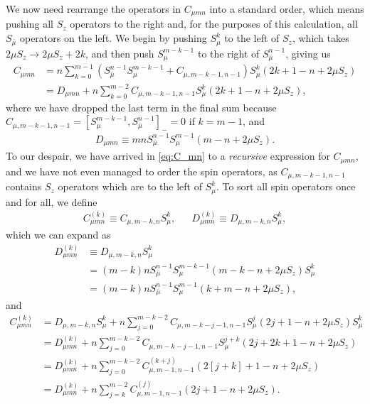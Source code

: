 \documentclass[aps,notitlepage,nofootinbib,11pt]{revtex4-1}
\newcommand{\p}[1]{\left(#1\right)} %
\renewcommand{\sp}[1]{\left[#1\right]} %
\newcommand{\bmu}{{\bar\mu}}
\newcommand{\1}{\mathds{1}}
\begin{document}
We now need rearrange the operators in $C_{\mu mn}$ into a standard
order, which means pushing all $S_z$ operators to the right and, for
the purposes of this calculation, all $S_\bmu$ operators on the left.
We begin by pushing $S_\mu^k$ to the left of $S_z$, which takes
$2\mu S_z\to 2\mu S_z+2k$, and then push $S_\mu^{m-k-1}$ to the right
of $S_\bmu^{n-1}$, giving us
\begin{align}
  C_{\mu mn}
  &= n \sum_{k=0}^{m-1}
  \p{S_\bmu^{n-1} S_\mu^{m-k-1} + C_{\mu,m-k-1,n-1}} S_\mu^k
  \p{2k + 1 - n + 2\mu S_z} \\
  &= D_{\mu mn}
  + n \sum_{k=0}^{m-2} C_{\mu,m-k-1,n-1}
  S_\mu^k \p{2k + 1 - n + 2\mu S_z},
  \label{eq:C_mn}
\end{align}
where we have dropped the last term in the final sum because
$C_{\mu,m-k-1,n-1}=\sp{S_\mu^{m-k-1},S_\bmu^{n-1}}_-=0$ if $k=m-1$,
and
\begin{align}
  D_{\mu mn}
  \equiv mn S_\bmu^{n-1} S_\mu^{m-1} \p{m - n + 2\mu S_z}.
  \label{eq:D_mn}
\end{align}
To our despair, we have arrived in \eqref{eq:C_mn} to a {\it
  recursive} expression for $C_{\mu mn}$, and we have not even managed
to order the spin operators, as $C_{\mu,m-k-1,n-1}$ contains $S_z$
operators which are to the left of $S_\mu^k$.  To sort all spin
operators once and for all, we define
\begin{align}
  C_{\mu mn}^{(k)} \equiv C_{\mu,m-k,n} S_\mu^k,
  &&
  D_{\mu mn}^{(k)} \equiv D_{\mu,m-k,n} S_\mu^k,
\end{align}
which we can expand as
\begin{align}
  D_{\mu mn}^{(k)}
  &\equiv D_{\mu,m-k,n}S_\mu^k \\
  &= \p{m-k}n S_\bmu^{n-1} S_\mu^{m-k-1}
  \p{m-k-n+2\mu S_z} S_\mu^k \\
  &= \p{m-k}n S_\bmu^{n-1} S_\mu^{m-1} \p{k+m-n+2\mu S_z},
  \label{eq:D_mn_k}
\end{align}
and
\begin{align}
  C_{\mu mn}^{(k)}
  &= D_{\mu,m-k,n} S_\mu^k + n \sum_{j=0}^{m-k-2}
  C_{\mu,m-k-j-1,n-1} S_\mu^j \p{2j+1-n+2\mu S_z} S_\mu^k \\
  &= D_{\mu mn}^{(k)} + n \sum_{j=0}^{m-k-2}
  C_{\mu,m-k-j-1,n-1} S_\mu^{j+k} \p{2j+2k+1-n+2\mu S_z} \\
  &= D_{\mu mn}^{(k)} + n \sum_{j=0}^{m-k-2}
  C_{\mu,m-1,n-1}^{(k+j)} \p{2\sp{j+k}+1-n+2\mu S_z} \\
  &= D_{\mu mn}^{(k)} + n \sum_{j=k}^{m-2}
  C_{\mu,m-1,n-1}^{(j)} \p{2j+1-n+2\mu S_z}.
  \label{eq:C_mn_k}
\end{align}
\end{document}
